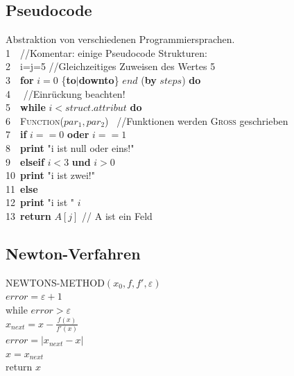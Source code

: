 \documentclass[10pt,a4paper]{scrartcl}
\begin{document}
\subsection{Pseudocode}
Abstraktion von verschiedenen Programmiersprachen.\\
1\ \ //Komentar: einige Pseudocode Strukturen:\\
2\ \ i=j=5 \hspace{10em}//Gleichzeitiges Zuweisen des Wertes 5\\
3\ \ \textbf{for} $i = 0$ \{\textbf{to}$|$\textbf{downto}\} $end$ (\textbf{by} $steps$) \textbf{do}\\
4\ \  \qquad //Einrückung beachten!\\
5\ \ \textbf{while} $i < struct.attribut$ \textbf{do}\\
6\ \ \quad \textsc{Function}($par_1,par_2$) \quad \ //Funktionen werden \textsc{Groß} geschrieben\\
7\ \ \quad \textbf{if} $i == 0$ \textbf{oder} $i == 1$\\
8\ \ \quad \quad \textbf{print} "i ist null oder eins!"\\
9\ \ \quad \textbf{elseif} $i < 3$ \textbf{und} $i > 0$\\
10\ \quad \quad \textbf{print} "i ist zwei!"\\
11\ \quad \textbf{else}\\
12\ \quad \quad \textbf{print} "i ist " $i$\\
13\ \textbf{return} $A[j]$ \quad // A ist ein Feld\\

\subsection{Newton-Verfahren}
NEWTONS-METHOD$(x_0,f,f',\varepsilon)$\\
$error = \varepsilon + 1$\\
while $error > \varepsilon$\\
	$x_{next} = x -\frac{f(x)}{f'(x)}$\\
	$error = |x_{next} - x|$\\
	$x=x_{next}$\\
return $x$\\
\end{document}
